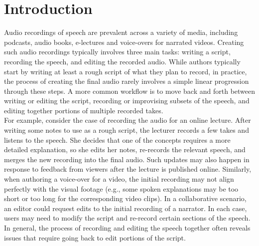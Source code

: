 \section{Introduction}
Audio recordings of speech are prevalent across a variety of media, including podcasts, audio books, e-lectures and voice-overs for narrated videos.
%
Creating such audio recordings typically involves three main tasks: writing a script, recording the speech, and editing the recorded audio. 
%
While authors typically start by writing at least a rough script of what they plan to record, in practice, the process of creating the final audio rarely involves a simple linear progression through these steps. A more common workflow is to move back and forth between writing or editing the script, recording or improvising subsets of the speech, and editing together portions of multiple recorded takes.\\

For example, consider the case of recording the audio for an online lecture. After writing some notes to use as a rough script, the lecturer records a few takes and listens to the speech. She decides that one of the concepts requires a more detailed explanation, so she edits her notes, re-records the relevant speech, and merges the new recording into the final audio. Such updates may also happen in response to feedback from viewers after the lecture is published online. Similarly, when authoring a voice-over for a video, the initial recording may not align perfectly with the visual footage (e.g., some spoken explanations may be too short or too long for the corresponding video clips). In a collaborative scenario, an editor could request edits to the initial recording of a narrator. In each case, users may need to modify the script and re-record certain sections of the speech. In general, the process of recording and editing the speech together often reveals issues that require going back to edit portions of the script.\\

